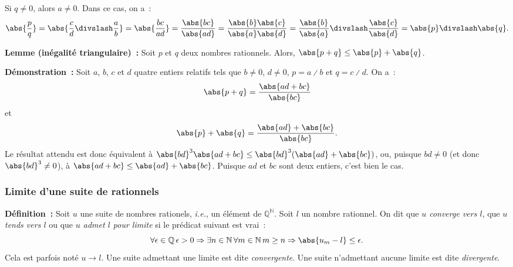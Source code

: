     Si $q \neq 0$, alors $a \neq 0$. 
    Dans ce cas, on a :
    \begin{equation*}
        \abs{\frac{p}{q}} 
        = \abs{\frac{c}{d} \divslash \frac{a}{b}}
        = \abs{\frac{b c}{a d}}
        = \frac{\abs{b c}}{\abs{a d}}
        = \frac{\abs{b} \abs{c}}{\abs{a} \abs{d}}
        = \frac{\abs{b}}{\abs{a}} \divslash \frac{\abs{c}}{\abs{d}}
        = \abs{p} \divslash \abs{q} .
    \end{equation*}
    
    \done

\medskip

\noindent\textbf{Lemme (inégalité triangulaire) :} Soit $p$ et $q$ deux nombres rationnels. 
    Alors, $\abs{p + q} \leq \abs{p} + \abs{q}$.

\medskip

\noindent\textbf{Démonstration :} 
    Soit $a$, $b$, $c$ et $d$ quatre entiers relatifs tels que $b \neq 0$, $d \neq 0$, $p = a \divslash b$ et $q = c \divslash d$.
    On a : 
    \begin{equation*}
        \abs{p + q} = \frac{\abs{a d + b c}}{\abs{b c}}
    \end{equation*}
    et 
    \begin{equation*}
        \abs{p} + \abs{q} = \frac{\abs{a d} + \abs{b c}}{\abs{b c}} .
    \end{equation*}
    Le résultat attendu est donc équivalent à $\abs{b d}^3 \abs{a d + b c} \leq \abs{b d}^3 (\abs{a d} + \abs{b c})$, ou, puisque $b d \neq 0$ (et donc $\abs{b d}^3 \neq 0$), à $ \abs{a d + b c} \leq \abs{a d} + \abs{b c}$. 
    Puisque $a d$ et $b c$ sont deux entiers, c'est bien le cas.

    \done

\subsubsection{Limite d'une suite de rationnels}

\noindent\textbf{Définition :} Soit $u$ une suite de nombres rationels, \emph{i.e.}, un élément de $\mathbb{Q}^{\mathbb{N}}$.
    Soit $l$ un nombre rationnel.
    On dit que \emph{$u$ converge vers $l$}, que \emph{$u$ tends vers $l$} ou que \emph{$u$ admet $l$ pour limite} si le prédicat suivant est vrai : 
    \begin{equation*}
        \forall \epsilon \in \mathbb{Q} \, 
        \epsilon > 0 \Rightarrow
            \exists n \in \mathbb{N} \, 
            \forall m \in \mathbb{N} \, 
            m \geq n \Rightarrow
                \abs{u_m - l} \leq \epsilon .
    \end{equation*}
    Cela est parfois noté $u \rightarrow l$.
    Une suite admettant une limite est dite \emph{convergente}. 
    Une suite n'admettant aucune limite est dite \emph{divergente}. 

